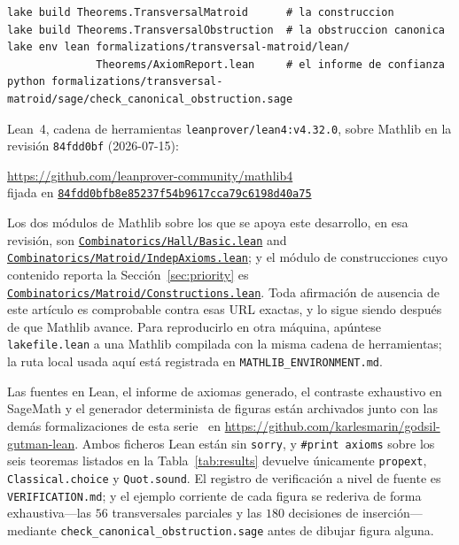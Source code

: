\documentclass[11pt]{article}
\newcommand{\lean}[1]{\texttt{#1}}
\begin{document}
\begin{verbatim}
lake build Theorems.TransversalMatroid      # la construccion
lake build Theorems.TransversalObstruction  # la obstruccion canonica
lake env lean formalizations/transversal-matroid/lean/
              Theorems/AxiomReport.lean     # el informe de confianza
python formalizations/transversal-matroid/sage/check_canonical_obstruction.sage
\end{verbatim}
{\sloppy Lean~4, cadena de herramientas \lean{leanprover/lean4:v4.32.0}, sobre Mathlib en la
revisión
\lean{84fdd0bf} (2026-07-15):
\begin{center}
\url{https://github.com/leanprover-community/mathlib4}\\[2pt]
fijada en
\href{https://github.com/leanprover-community/mathlib4/commit/84fdd0bfb8e85237f54b9617cca79c6198d40a75}%
{\lean{84fdd0bfb8e85237f54b9617cca79c6198d40a75}}
\end{center}
Los dos módulos de Mathlib sobre los que se apoya este desarrollo, en esa revisión, son
\href{https://github.com/leanprover-community/mathlib4/blob/84fdd0bfb8e85237f54b9617cca79c6198d40a75/Mathlib/Combinatorics/Hall/Basic.lean}%
{\lean{Combinatorics/Hall/Basic.lean}} and
\href{https://github.com/leanprover-community/mathlib4/blob/84fdd0bfb8e85237f54b9617cca79c6198d40a75/Mathlib/Combinatorics/Matroid/IndepAxioms.lean}%
{\lean{Combinatorics/Matroid/IndepAxioms.lean}}; y el módulo de construcciones cuyo contenido
reporta la Sección~\ref{sec:priority} es
\href{https://github.com/leanprover-community/mathlib4/blob/84fdd0bfb8e85237f54b9617cca79c6198d40a75/Mathlib/Combinatorics/Matroid/Constructions.lean}%
{\lean{Combinatorics/Matroid/Constructions.lean}}. Toda afirmación de ausencia de este artículo es
comprobable contra esas URL exactas, y lo sigue siendo después de que Mathlib avance. Para
reproducirlo en otra máquina, apúntese \lean{lakefile.lean} a una Mathlib compilada con la misma
cadena de herramientas; la ruta local usada aquí está registrada en
\lean{MATHLIB\_ENVIRONMENT.md}.\par}

{\sloppy Las fuentes en Lean, el informe de axiomas generado, el contraste exhaustivo en SageMath y
el generador determinista de figuras están archivados junto con las demás formalizaciones de esta
serie~\cite{neumann,gglean,newtonlean} en
\url{https://github.com/karlesmarin/godsil-gutman-lean}. Ambos ficheros Lean están sin
\lean{sorry}, y \lean{\#print axioms} sobre los seis teoremas listados en la
Tabla~\ref{tab:results} devuelve únicamente \lean{propext}, \lean{Classical.choice} y
\lean{Quot.sound}. El registro de verificación a nivel de fuente es \lean{VERIFICATION.md}; y el
ejemplo corriente de cada figura se rederiva de forma exhaustiva---las $56$ transversales parciales
y las $180$ decisiones de inserción---mediante \lean{check\_canonical\_obstruction.sage} antes de
dibujar figura alguna.\par}
\end{document}
